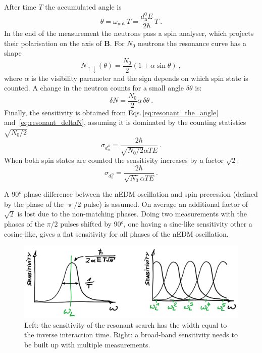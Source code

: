 After time $T$ the accumulated angle is
\begin{equation}
  \theta = \omega_\text{nut.} T = \frac{d_\text{n}^0 E }{2 \hbar} \, T \ .
  \label{eq:resonant_the_angle}
\end{equation}
In the end of the measurement the neutrons pass a spin analyser, which projects their polarisation on the axis of $\mathbf{B}$. For $N_0$ neutrons the resonance curve has a shape
\begin{equation}
  N_{\uparrow \downarrow}(\theta) = \frac{N_0}{2} \left( 1 \pm \alpha \sin \theta  \right)  \ ,
\end{equation}
where $\alpha$ is the visibility parameter and the sign depends on which spin state is counted. A change in the neutron counts for a small angle $\delta \theta$ is:
\begin{equation}
  \delta N = \frac{N_0}{2} \alpha \, \delta \theta \ .
  \label{eq:resonant_deltaN}
\end{equation}
Finally, the sensitivity is obtained from Eqs.\,\ref{eq:resonant_the_angle} and~\ref{eq:resonant_deltaN}, assuming it is dominated by the counting statistics $\sqrt{N_0/2}$
\begin{equation}
  \sigma_{d_n^{\,0}} = \frac{2 \hbar}{\sqrt{N_0/2} \alpha T E} \ .
\end{equation}
When both spin states are counted the sensitivity increases by a factor $\sqrt{2}$:
\begin{equation}
  \sigma_{d_n^{\,0}} = \frac{2 \hbar}{\sqrt{N_0} \alpha T E} \ .
\end{equation}

A \ang{90} phase difference between the nEDM oscillation and spin precession (defined by the phase of the $\uppi/2$ pulse) is assumed. On average an additional factor of $\sqrt{2}$ is lost due to the non-matching phases.
Doing two measurements with the phases of the $\pi/2$ pulses shifted by \ang{90}, one having a sine-like sensitivity other a cosine-like, gives a flat sensitivity for all phases of the nEDM oscillation.

\begin{figure}
  \centering
  \includegraphics[width=\linewidth]{gfx/axions/resonant_sensitivity.png}
  \caption{Left: the sensitivity of the resonant search has the width equal to the inverse interaction time. Right: a broad-band sensitivity needs to be built up with multiple measurements.}\label{fig:axions_resonant_sensitivity}
\end{figure}

